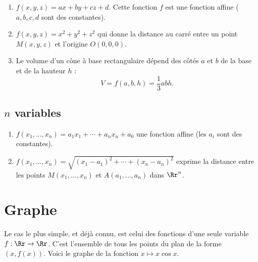 \documentclass[11pt,class=report,crop=false]{standalone}
\begin{document}
\begin{exemple}
\sauteligne
\begin{enumerate}
  \item $f(x,y,z) = ax+by+cz+d$. Cette fonction $f$ est une fonction affine ($a,b,c,d$ sont des constantes).
   \item $f(x,y,z) = x^2+y^2+z^2$ qui donne la distance au carré entre un point $M(x,y,z)$ et l'origine $O(0,0,0)$.
   \item Le volume d'un cône à base rectangulaire dépend des côtés $a$ et $b$ de la base et de la hauteur $h$ :
   $$V = f(a,b,h) = \frac13 abh.$$
   
     
\end{enumerate}
\end{exemple}


\subsection{$n$ variables}

\begin{exemple}
\sauteligne
\begin{enumerate}
  \item $f(x_1,\ldots,x_n) = a_1x_1+\cdots+a_nx_n+a_0$ une fonction affine (les $a_i$ sont des constantes).
  \item $f(x_1,\ldots,x_n) = \sqrt{(x_1-a_1)^2+\cdots+(x_n-a_n)^2}$ exprime la distance entre les points $M(x_1,\ldots,x_n)$ et $A(a_1,\ldots,a_n)$ dans $\Rr^n$.
\end{enumerate}
\end{exemple}


\section{Graphe}

Le cas le plus simple, et déjà connu, est celui des fonctions d'une seule variable $f : \Rr \rightarrow \Rr$.  C'est l'ensemble de tous les points du plan de la forme $(x,f(x))$. Voici le graphe de la fonction $x \mapsto x\cos x$.




\end{document}
